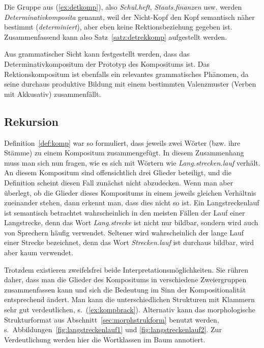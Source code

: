 Die Gruppe aus (\ref{ex:detkomp}), also \textit{Schul.heft}, \textit{Staats.finanzen} usw. werden \textit{Determinativkomposita} genannt, weil der Nicht-Kopf den Kopf semantisch näher bestimmt (\textit{determiniert}), aber eben keine Rektionsbeziehung gegeben ist.
Zusammenfassend kann also Satz~\ref{satz:detrekkomp} aufgestellt werden.


Aus grammatischer Sicht kann festgestellt werden, dass das Determinativkompositum der Prototyp des Kompositums ist.
Das Rektionskompositum ist ebenfalls ein relevantes grammatisches Phänomen, da seine durchaus produktive Bildung mit einem bestimmten Valenzmuster (Verben mit Akkusativ) zusammenfällt.

\subsection{Rekursion}

\label{sec:rekursion}


Definition~\ref{def:komp} war so formuliert, dass jeweils zwei Wörter (bzw. ihre Stämme) zu einem Kompositum zusammengefügt.
In diesem Zusammenhang muss man sich nun fragen, wie es sich mit Wörtern wie \textit{Lang.strecken.lauf} verhält.
An diesem Kompositum sind offensichtlich drei Glieder beteiligt, und die Definition scheint diesen Fall zunächst nicht abzudecken.
Wenn man aber überlegt, ob die Glieder dieses Kompositums in einem jeweils gleichen Verhältnis zueinander stehen, dann erkennt man, dass dies nicht so ist.
Ein Langstreckenlauf ist semantisch betrachtet wahrscheinlich in den meisten Fällen der Lauf einer Langstrecke, denn das Wort \textit{Lang.strecke} ist nicht nur bildbar, sondern wird auch von Sprechern häufig verwendet.
Seltener wird wahrscheinlich der lange Lauf einer Strecke bezeichnet, denn das Wort \textit{Strecken.lauf} ist durchaus bildbar, wird aber kaum verwendet.

Trotzdem existieren zweifelsfrei beide Interpretationsmöglichkeiten.
Sie rühren daher, dass man die Glieder des Kompositums in verschiedene Zweiergruppen zusammenfassen kann und sich die Bedeutung im Sinn der Kompositionalität entsprechend ändert.
Man kann die unterschiedlichen Strukturen mit Klammern sehr gut verdeutlichen, s.\ (\ref{ex:kompbrack}).
Alternativ kann das morphologische Strukturformat aus Abschnitt~\ref{sec:morphstrukform} benutzt werden, s.\ Abbildungen~\ref{fig:langstreckenlauf1} und \ref{fig:langstreckenlauf2}.
Zur Verdeutlichung werden hier die Wortklassen im Baum annotiert.

